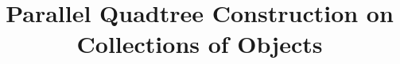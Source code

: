 \documentclass[final,3p,times,twocolumn]{elsarticle}
\begin{document}
\begin{frontmatter}



\title{Parallel Quadtree Construction on Collections of Objects}





\end{frontmatter}
\end{document}

